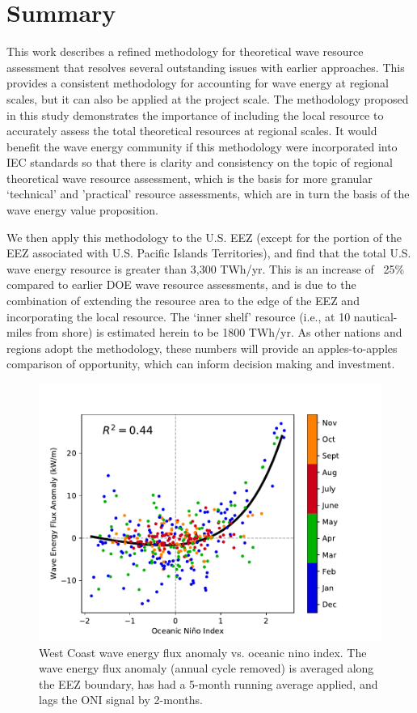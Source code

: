 \section{Summary}

This work describes a refined methodology for theoretical wave resource assessment that resolves several outstanding issues with earlier approaches. This provides a consistent methodology for accounting for wave energy at regional scales, but it can also be applied at the project scale. The methodology proposed in this study demonstrates the importance of including the local resource to accurately assess the total theoretical resources at regional scales. It would benefit the wave energy community if this methodology were incorporated into IEC standards so that there is clarity and consistency on the topic of regional theoretical wave resource assessment, which is the basis for more granular `technical' and 'practical' resource assessments, which are in turn the basis of the wave energy value proposition.

We then apply this methodology to the U.S. EEZ (except for the portion of the EEZ associated with U.S. Pacific Islands Territories), and find that the total U.S. wave energy resource is greater than 3,300 TWh/yr.
This is an increase of ~25\% compared to earlier DOE wave resource assessments, and is due to the combination of extending the resource area to the edge of the EEZ and incorporating the local resource. The `inner shelf' resource (i.e., at 10 nautical-miles from shore) is estimated herein to be 1800 TWh/yr.  As other nations and regions adopt the methodology, these numbers will provide an apples-to-apples comparison of opportunity, which can inform decision making and investment.



\begin{figure}[ht]
  \centering
  \includegraphics[width=\textwidth]{../fig/ENSO-Comparison.wc.pdf}
  \caption{West Coast wave energy flux anomaly vs. oceanic nino index. The wave energy flux anomaly (annual cycle removed) is averaged along the EEZ boundary, has had a 5-month running average applied, and lags the ONI signal by 2-months.}
  \label{fig:wc-nino}
\end{figure}


